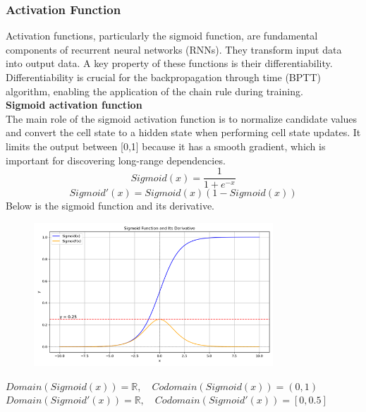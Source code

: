 \documentclass[12pt,a4paper]{article}
\begin{document}
\subsubsection{Activation Function}
Activation functions, particularly the sigmoid function, are fundamental components of recurrent neural networks (RNNs). They transform input data into output data. A key property of these functions is their differentiability. Differentiability is crucial for the backpropagation through time (BPTT) algorithm, enabling the application of the chain rule during training. \\[1ex]
\textbf{Sigmoid activation function}
\\[1ex]
The main role of the sigmoid activation function is to normalize candidate values and convert the cell state to a hidden state when performing cell state updates. It limits the output between [0,1] because it has a smooth gradient, which is important for discovering long-range dependencies.\\[1ex]
\begin{equation}
    Sigmoid(x) = \frac{ 1 }{ 1+e^{-x} }
\end{equation}
\begin{equation}
    Sigmoid'(x) = Sigmoid(x)(1-Sigmoid(x))
\end{equation}
Below is the sigmoid function and its derivative.
\newpage
\begin{figure}[!h]
    \centering
    \includegraphics[width=0.8\textwidth]{../Pic/sigmoid.png} %
\end{figure}

$Domain(Sigmoid(x))=\mathbb{R},\hspace{1em} Codomain(Sigmoid(x))=(0,1)$\\
$Domain(Sigmoid'(x))=\mathbb{R},\hspace{1em} Codomain(Sigmoid'(x))=[0,0.5]$
\newline
\end{document}
